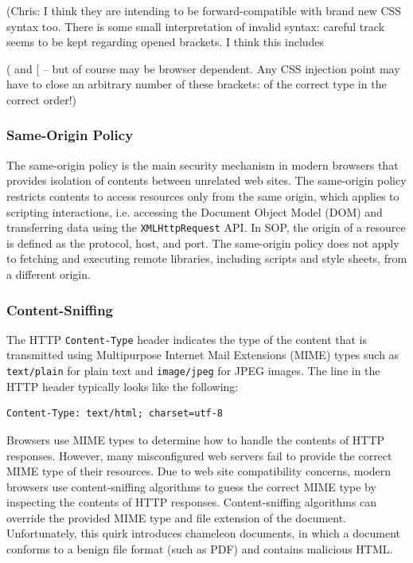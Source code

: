 \documentclass{acm_proc_article-sp}
\begin{document}
(Chris: I think they are intending to be forward-compatible with brand new CSS syntax too.
There is some small interpretation of invalid syntax: careful track seems to be kept regarding opened brackets. I think this includes { ( and [ -- but of course may be browser dependent. Any CSS injection point may have to close an arbitrary number of these brackets: of the correct type in the correct order!)

\subsubsection{Same-Origin Policy}
The same-origin policy\cite{mozillasameorigin} is the main security mechanism in modern browsers that provides isolation of contents between unrelated web sites. The same-origin policy restricts contents to access resources only from the same origin, which applies to scripting interactions, i.e. accessing the Document Object Model (DOM)\cite{dom} and transferring data using the \texttt{XMLHttpRequest} API. In SOP, the origin of a resource is defined as the protocol, host, and port. The same-origin policy does not apply to fetching and executing remote libraries, including scripts and style sheets, from a different origin.

\subsubsection{Content-Sniffing}
The HTTP \texttt{Content-Type} header indicates the type of the content that is transmitted using Multipurpose Internet Mail Extensions (MIME)\cite{mime} types such as \texttt{text/plain} for plain text and \texttt{image/jpeg} for JPEG images. The line in the HTTP header typically looks like the following:
\begin{verbatim}
Content-Type: text/html; charset=utf-8
\end{verbatim}
Browsers use MIME types to determine how to handle the contents of HTTP responses. However, many misconfigured web servers fail to provide the correct MIME type of their resources. Due to web site compatibility concerns, modern browsers use content-sniffing algorithms\cite{securecontentsniffing} to guess the correct MIME type by inspecting the contents of HTTP responses.  Content-sniffing algorithms can override the provided MIME type and file extension of the document. Unfortunately, this quirk introduces chameleon documents, in which a document conforms to a benign file format (such as PDF) and contains malicious HTML.

}
\end{document}
